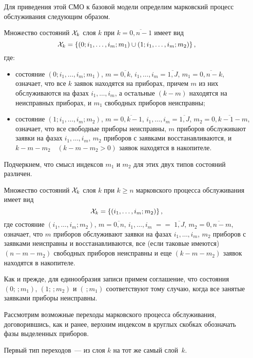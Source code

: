 \begin{multicols}{2}
Для приведения этой СМО к базовой модели определим марковский
процесс обслуживания следующим образом.

Множество состояний ${\cal X}_k$ слоя $k$ при $k=\overline{0,n-1}$
имеет вид
$$
{\cal X}_k
=
\{(0;i_1,\ldots,i_m;m_1)\cup (1;i_1,\ldots,i_m;m_2)\}\,,
$$
где:
\begin{itemize}
\item состояние $(0;i_1,\ldots,i_m;m_1)$, $m=\overline{0,k}$,
$i_1,\ldots,i_m=\overline{1,J}$, $m_1=\overline{0,n-k}$,
означает, что все $k$ заявок находятся на приборах,
причем $m$ из них обслуживаются на фазах $i_1,\ldots,i_m$,
а остальные $(k-m)$ находятся на неисправных приборах,
и $m_1$ свободных приборов неисправны;
\item
 состояние $(1;i_1,\ldots,i_m;m_2)$, $m=\overline{0,k-1}$,
$i_1,\ldots,i_m=\overline{1,J}$, $m_2=\overline{0,k-1-m}$,
означает, что все свободные приборы неисправны,
$m$ приборов обслуживают заявки на фазах $i_1,\ldots,i_m$,
$m_2$ приборов с заявками вос\-ста\-нав\-ли\-ва\-ют\-ся, и $k-m-m_2$\ \ 
$(k-m-m_2>0)$ заявок находятся в накопителе.
\end{itemize}

Подчеркнем, что смысл индексов $m_1$ и $m_2$ для этих двух типов
состояний различен.

Множество состояний ${\cal X}_k$ слоя $k$ при $k\ge n$
марковского процесса обслуживания имеет вид
$$
{\cal X}_k
=
\{ (i_1,\ldots, i_m; m_2)\}\,,
$$
где состояние $(i_1,\ldots, i_m; m_2)$, $m=\overline{0,n}$,
$i_1,\ldots,i_m\;=$\linebreak $=\;\overline{1,J}$, $m_2=\overline{0,n-m}$,
означает, что $m$ приборов обслуживают заявки на фазах
$i_1,\ldots, i_m$, $m_2$ приборов с заявками неисправны и
восстанавливаются,
все (если таковые имеются) $(n-m-m_2)$ свободных приборов неисправны
и еще $(k-m-m_2)$ заявок находятся в накопителе.

Как и прежде, для единообразия записи примем соглашение, что
состояния $(0;\,;m_1)$, $(1;\,;m_2)$ и $(\,;m_1)$ соответствуют
тому случаю, когда все занятые заявками приборы неисправны.

Рассмотрим возможные переходы марковского процесса обслуживания,
договорившись, как и ранее, верхним индексом в круглых скобках
обозначать фазы выделенных приборов.

Первый тип переходов~--- из слоя $k$ на тот же самый слой~$k$.


\end{multicols}
